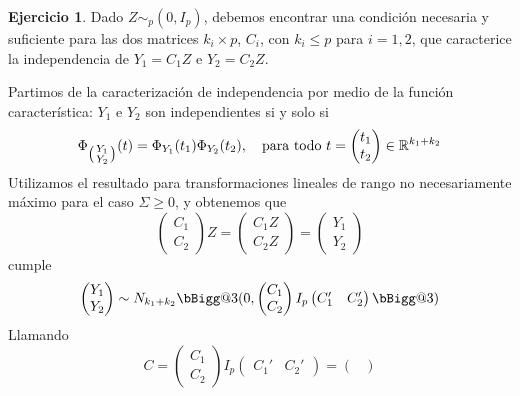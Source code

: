 \documentclass[12pt,spanish]{article}
\makeatletter
\newcommand{\vast}{\bBigg@{3}}
\theoremstyle{definition}
\newtheorem{exercise}{Ejercicio}
\makeatother
\begin{document}
\begin{exercise} %
  Dado $Z\sim_p(0,I_p)$, debemos encontrar una condición necesaria y
  suficiente para las dos matrices $k_i\times p$, $C_i$, con
  $k_i\leq p$ para $i=1,2$, que caracterice la independencia de
  $Y_1=C_1 Z$ e $Y_2=C_2 Z$.

  Partimos de la caracterización de independencia por medio de la
  función característica: $Y_1$ e $Y_2$ son independientes si y solo si
  \begin{equation} \label{indep-caracteristica}
    \Phi_{
      \begin{psmallmatrix}
        Y_1 \\ Y_2
      \end{psmallmatrix}
    }(t)=\Phi_{Y_1}(t_1)\Phi_{Y_2}(t_2),\quad\text{para todo } t=\begin{pmatrix}
      t_1 \\ t_2
    \end{pmatrix}\in\mathbb{R}^{k_1+k_2}
  \end{equation}
  Utilizamos el resultado para transformaciones lineales de rango no
  necesariamente máximo para el caso $\Sigma\geq 0$, y obtenemos que
  \[\begin{pmatrix}
      C_1 \\ C_2
    \end{pmatrix}Z=\begin{pmatrix}
      C_1 Z \\ C_2 Z
    \end{pmatrix}=\begin{pmatrix}
      Y_1 \\ Y_2
    \end{pmatrix}\]
  cumple
  \[\begin{pmatrix}
      Y_1 \\ Y_2
    \end{pmatrix}\sim N_{k_1+k_2}\vast(0,\begin{pmatrix}
      C_1 \\ C_2
    \end{pmatrix} I_p \begin{pmatrix}
      C_1' & C_2'
    \end{pmatrix}\vast)\]
  Llamando \[C=\begin{pmatrix}
      C_1 \\ C_2
    \end{pmatrix} I_p \begin{pmatrix}
      C_1' & C_2'
    \end{pmatrix}=\begin{pmatrix}

\end{pmatrix}\]
\end{exercise}
\end{document}
